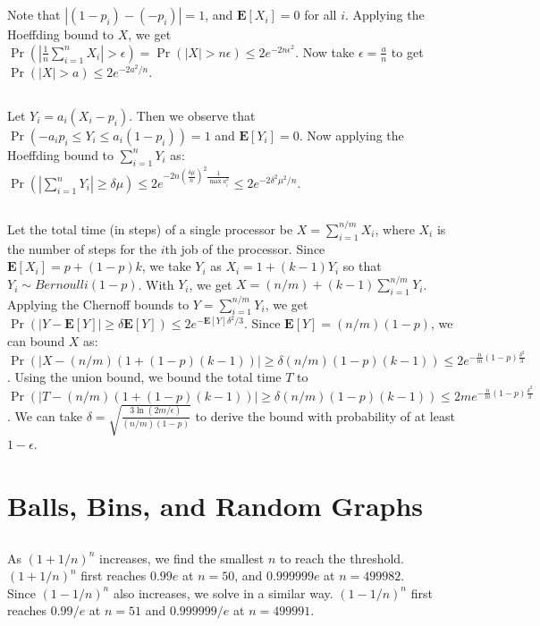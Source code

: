 \documentclass{article}
\begin{document}
\subsection{}
Note that $|(1-p_i)-(-p_i)|=1$, and $\textbf{E}[X_i]=0$ for all $i$.
Applying the Hoeffding bound to $X$, we get $\Pr(|\frac{1}{n}\sum\limits_{i=1}^nX_i | > \epsilon)=\Pr(|X|>n\epsilon)\leq2e^{-2n\epsilon^2}$.
Now take $\epsilon=\frac{a}{n}$ to get $\Pr(|X|>a)\leq 2e^{-2a^2/n}$.
\subsection{}
Let $Y_i=a_i(X_i-p_i)$. Then we observe that $\Pr(-a_ip_i \leq Y_i \leq a_i(1-p_i))=1$ and $\textbf{E}[Y_i]=0$.
Now applying the Hoeffding bound to $\sum\limits_{i=1}^nY_i$ as:\\
$\Pr(|\sum\limits_{i=1}^nY_i|\geq\delta\mu)\leq 2e^{-2n(\frac{\delta\mu}{n})^2\frac{1}{\max a_i^2}}\leq2e^{-2\delta^2\mu^2/n}$.
\subsection{}
Let the total time (in steps) of a single processor be $X=\sum\limits_{i=1}^{n/m}X_i$, where $X_i$ is the number of steps for the $i$th job of the processor.
Since $\textbf{E}[X_i]=p+(1-p)k$, we take $Y_i$ as $X_i=1+(k-1)Y_i$ so that $Y_i\sim Bernoulli(1-p)$. With $Y_i$, we get $X=(n/m)+(k-1)\sum\limits_{i=1}^{n/m}Y_i$.\\
Applying the Chernoff bounds to $Y=\sum\limits_{i=1}^{n/m}Y_i$, we get $\Pr(|Y-\textbf{E}[Y]|\geq \delta\textbf{E}[Y])\leq 2e^{-\textbf{E}[Y]\delta^2/3}$.
Since $\textbf{E}[Y]=(n/m)(1-p)$, we can bound $X$ as:\\
$\Pr(|X-(n/m)(1+(1-p)(k-1))|\geq\delta (n/m)(1-p)(k-1))\leq2e^{-\frac{n}{m}(1-p)\frac{\delta^2}{3}}$.
Using the union bound, we bound the total time $T$ to $\Pr(|T-(n/m)(1+(1-p)(k-1))|\geq\delta (n/m)(1-p)(k-1))\leq2me^{-\frac{n}{m}(1-p)\frac{\delta^2}{3}}$.
We can take $\delta=\sqrt{\frac{3\ln(2m/\epsilon)}{(n/m)(1-p)}}$ to derive the bound with probability of at least $1-\epsilon$.
\subsection{}
\newpage
\section{Balls, Bins, and Random Graphs}
\subsection{}
As $(1+1/n)^n$ increases, we find the smallest $n$ to reach the threshold.\\
$(1+1/n)^n$ first reaches $0.99e$ at $n=50$, and $0.999999e$ at $n=499982$.\\
Since $(1-1/n)^n$ also increases, we solve in a similar way. $(1-1/n)^n$ first reaches $0.99/e$ at $n=51$ and $0.999999/e$ at $n=499991$.
\end{document}
